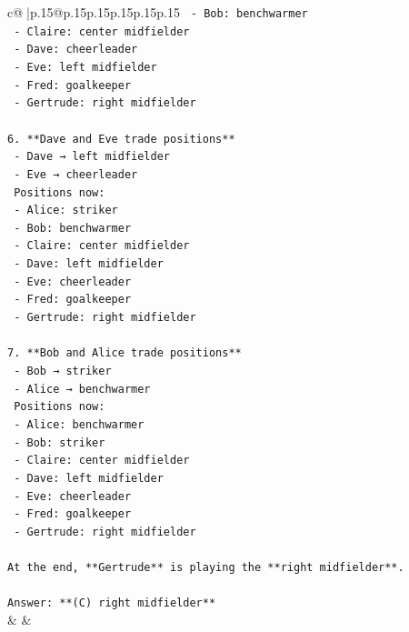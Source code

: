\documentclass{article}
\begin{document}
{\begin{supertabular}{c@{$\;$}|p{.15\linewidth}@{}p{.15\linewidth}p{.15\linewidth}p{.15\linewidth}p{.15\linewidth}p{.15\linewidth}}
{{{\texttt{   {-} Bob: benchwarmer  } \\
\texttt{   {-} Claire: center midfielder  } \\
\texttt{   {-} Dave: cheerleader  } \\
\texttt{   {-} Eve: left midfielder  } \\
\texttt{   {-} Fred: goalkeeper  } \\
\texttt{   {-} Gertrude: right midfielder  } \\
\\ 
\texttt{6. **Dave and Eve trade positions**  } \\
\texttt{   {-} Dave → left midfielder  } \\
\texttt{   {-} Eve → cheerleader  } \\
\texttt{   Positions now:  } \\
\texttt{   {-} Alice: striker  } \\
\texttt{   {-} Bob: benchwarmer  } \\
\texttt{   {-} Claire: center midfielder  } \\
\texttt{   {-} Dave: left midfielder  } \\
\texttt{   {-} Eve: cheerleader  } \\
\texttt{   {-} Fred: goalkeeper  } \\
\texttt{   {-} Gertrude: right midfielder  } \\
\\ 
\texttt{7. **Bob and Alice trade positions**  } \\
\texttt{   {-} Bob → striker  } \\
\texttt{   {-} Alice → benchwarmer  } \\
\texttt{   Positions now:  } \\
\texttt{   {-} Alice: benchwarmer  } \\
\texttt{   {-} Bob: striker  } \\
\texttt{   {-} Claire: center midfielder  } \\
\texttt{   {-} Dave: left midfielder  } \\
\texttt{   {-} Eve: cheerleader  } \\
\texttt{   {-} Fred: goalkeeper  } \\
\texttt{   {-} Gertrude: right midfielder  } \\
\\ 
\texttt{At the end, **Gertrude** is playing the **right midfielder**.} \\
\\ 
\texttt{Answer: **(C) right midfielder**} \\
            }
        }
    }
    & & \\ \\


\end{supertabular}}
\end{document}
